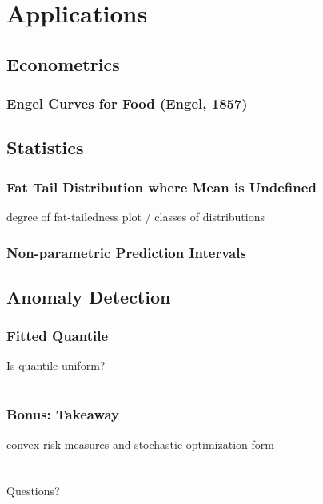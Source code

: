 \documentclass{beamer}
\begin{document}
\section{Applications}

\subsection{Econometrics}

\begin{frame}
\frametitle{Engel Curves for Food (Engel, 1857)}



\end{frame}


\subsection{Statistics}

\begin{frame}
\frametitle{Fat Tail Distribution where Mean is Undefined}

degree of fat-tailedness plot / classes of distributions

\end{frame}


\begin{frame}
\frametitle{Non-parametric Prediction Intervals}



\end{frame}


\subsection{Anomaly Detection}

\begin{frame}
\frametitle{Fitted Quantile}

Is quantile uniform?

\end{frame}



\section*{}
\begin{frame}
\frametitle{Bonus: Takeaway}

convex risk measures and stochastic optimization form

\end{frame}


\section*{}
\begin{frame}
\Huge{\centerline{Questions?}}
\end{frame}

\end{document}
